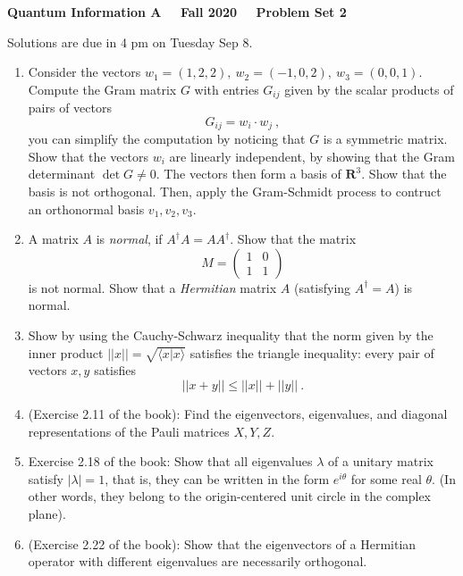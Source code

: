 \documentclass[12pt]{article}
\newcommand{\Rmath}{\mathbf{R}}
\begin{document}
\normalsize

\baselineskip 14pt

\begin{center}
{\Large {\bf Quantum Information A \ \ Fall 2020 \ \  Problem Set 2}}
\end{center}

\bigskip

 Solutions are due in 4 pm
on Tuesday Sep 8. 


\begin{enumerate}

\item Consider the vectors $w_1=(1,2,2),\ w_2=(-1,0,2), \ w_3= (0,0,1)$. Compute the Gram matrix $G$ with entries $G_{ij}$ given by the scalar products of pairs of vectors
$$
G_{ij} = w_i \cdot w_j \ ,
$$
you can simplify the computation by noticing that $G$ is a symmetric matrix. Show that the vectors $w_i$ are linearly independent, by showing that the Gram determinant $\det G\neq 0$.
The vectors then form a basis of $\Rmath^3$. Show that the basis is not orthogonal. Then, apply the Gram-Schmidt process
to contruct an orthonormal basis $v_1,v_2,v_3$.

\item A matrix $A$ is {\em normal}, if $A^\dagger A = AA^\dagger$. Show that the matrix 
$$
M = \left( \begin{array}{cc} 1 & 0 \\ 1 & 1 \end{array} \right) 
$$
is not normal. Show that a {\em Hermitian} matrix $A$ (satisfying $A^\dagger =A$) is normal.


\item  Show by using the Cauchy-Schwarz inequality that the norm given by the inner product $||x||=\sqrt{\langle x | x\rangle}$ satisfies the triangle inequality: every pair of vectors $x,y$ satisfies
$$
||x+y || \leq ||x||+||y|| \ .
$$

\item (Exercise 2.11 of the book): Find the eigenvectors, eigenvalues, and diagonal representations of the Pauli matrices $X,Y,Z$.

\item {Exercise 2.18 of the book:} Show that all eigenvalues $\lambda$ of a unitary matrix satisfy $|\lambda|=1$, that is, they can be written in the form $e^{i\theta}$ for some real $\theta$. (In other words, they belong
to the origin-centered unit circle in the complex plane).

\item (Exercise 2.22 of the book): Show that the eigenvectors of a Hermitian operator with different eigenvalues are necessarily orthogonal.


\end{enumerate}
\end{document}

